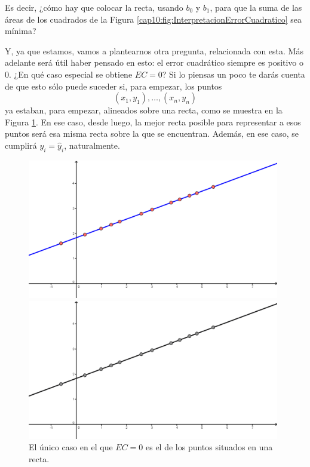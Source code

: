 \begin{center}
\end{center}
Es decir, ¿cómo hay que colocar la recta, usando $b_0$ y $b_1$, para que la suma de las áreas de los cuadrados de la Figura \ref{cap10:fig:InterpretacionErrorCuadratico} sea mínima?

Y, ya que estamos, vamos a plantearnos otra pregunta, relacionada con esta. Más adelante será útil haber pensado en esto: el error cuadrático siempre es positivo o $0$. ¿En qué caso especial se obtiene $EC=0$? Si lo piensas un poco te darás cuenta de que esto sólo puede suceder si, para empezar, los puntos
\[(x_1,y_1),\ldots,(x_n,y_n)\]
ya estaban, para empezar, alineados sobre una recta, como se muestra en la Figura \ref{cap10:fig:ErrorCuadraticoIgual0}. En ese caso, desde luego, la mejor recta posible para representar a esos puntos será esa misma recta sobre la que se encuentran. Además, en ese caso, se cumplirá $y_i=\hat y_i$, naturalmente.

\begin{figure}[htbp]
\begin{center}
\begin{enColor}
\includegraphics[width=11cm]{../fig/Cap10-ErrorCuadraticoIgual0.png}
\end{enColor}
\begin{bn}
\includegraphics[width=11cm]{../fig/Cap10-ErrorCuadraticoIgual0-bn.png}
\end{bn}
\caption{El único caso en el que $EC=0$ es el de los puntos situados en una recta.}
\label{cap10:fig:ErrorCuadraticoIgual0}
\end{center}
\end{figure}

